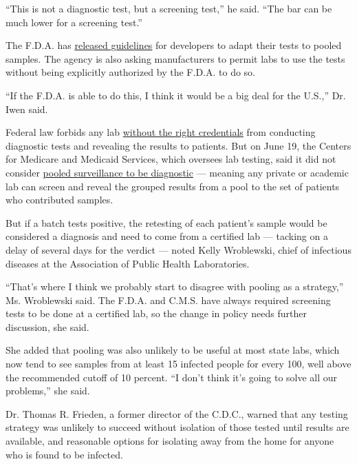 ``This is not a diagnostic test, but a screening test,'' he said. ``The
bar can be much lower for a screening test.''

The F.D.A. has
\href{https://www.fda.gov/news-events/press-announcements/coronavirus-covid-19-update-facilitating-diagnostic-test-availability-asymptomatic-testing-and}{released
guidelines} for developers to adapt their tests to pooled samples. The
agency is also asking manufacturers to permit labs to use the tests
without being explicitly authorized by the F.D.A. to do so.

``If the F.D.A. is able to do this, I think it would be a big deal for
the U.S.,'' Dr. Iwen said.

Federal law forbids any lab
\href{https://www.cms.gov/Regulations-and-Guidance/Legislation/CLIA}{without
the right credentials} from conducting diagnostic tests and revealing
the results to patients. But on June 19, the Centers for Medicare and
Medicaid Services, which oversees lab testing, said it did not consider
\href{https://www.cms.gov/files/document/06-19-2020-frequently-asked-questions-covid-surveillance-testing.pdf}{pooled
surveillance to be diagnostic} --- meaning any private or academic lab
can screen and reveal the grouped results from a pool to the set of
patients who contributed samples.

But if a batch tests positive, the retesting of each patient's sample
would be considered a diagnosis and need to come from a certified lab
--- tacking on a delay of several days for the verdict --- noted Kelly
Wroblewski, chief of infectious diseases at the Association of Public
Health Laboratories.

``That's where I think we probably start to disagree with pooling as a
strategy,'' Ms. Wroblewski said. The F.D.A. and C.M.S. have always
required screening tests to be done at a certified lab, so the change in
policy needs further discussion, she said.

She added that pooling was also unlikely to be useful at most state
labs, which now tend to see samples from at least 15 infected people for
every 100, well above the recommended cutoff of 10 percent. ``I don't
think it's going to solve all our problems,'' she said.

Dr. Thomas R. Frieden, a former director of the C.D.C., warned that any
testing strategy was unlikely to succeed without isolation of those
tested until results are available, and reasonable options for isolating
away from the home for anyone who is found to be infected.

